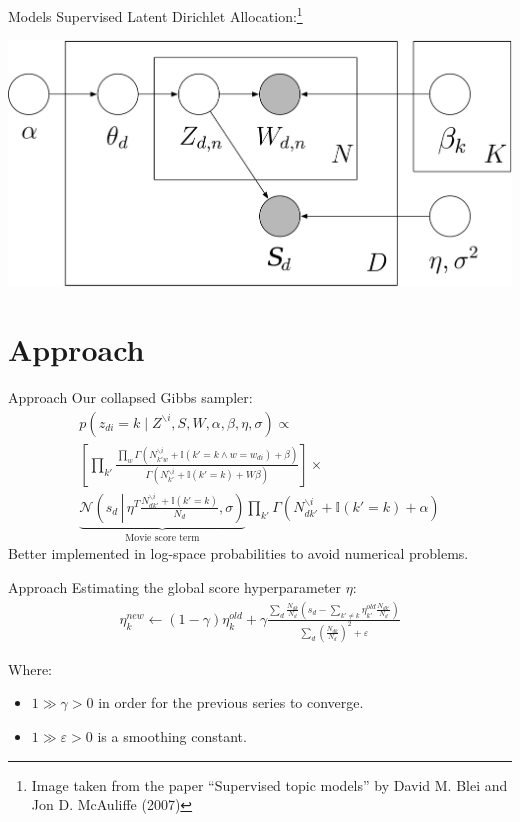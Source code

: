 \documentclass{beamer}
\begin{document}
\begin{frame}{Models}
	Supervised Latent Dirichlet Allocation:\footnote{\tiny{}Image taken from the paper ``Supervised topic models'' by David M. Blei and Jon D. McAuliffe (2007)}

	\includegraphics[width=\textwidth]{SLDA-S.png}
\end{frame}

\section{Approach}

\begin{frame}{Approach}
	Our collapsed Gibbs sampler:
	\begin{multline*}
	p(z_{di} = k \mid Z^{\backslash i}, S, W, \alpha, \beta, \eta, \sigma) \propto \\
	\left[ \prod_{k'} \frac{\prod_w \Gamma(N_{{k'}w}^{\backslash i} + \mathbb{I}(k' = k \wedge w = w_{di}) + \beta)}{\Gamma(N_{k'}^{\backslash i} + \mathbb{I}(k' = k) + W \beta)} \right] \times \\
	\underbrace{\mathcal{N}\left(s_d\, \left|\, \eta^T \frac{N_{d{k'}}^{\backslash i} + \mathbb{I}(k' = k)}{N_d}, \sigma\right. \right)}_\text{Movie score term} \prod_{k'} \Gamma(N_{d{k'}}^{\backslash i} + \mathbb{I}(k' = k) + \alpha)
	\end{multline*}
	Better implemented in log-space probabilities to avoid numerical problems.
\end{frame}

\begin{frame}{Approach}
	Estimating the global score hyperparameter $\eta$:
	\begin{multline*}
	\eta_k^{new} \leftarrow (1 - \gamma) \eta_k^{old} + \gamma \frac{\sum_d \frac{N_{dk}}{N_d} \left( s_d - \sum_{k' \ne k} \eta_{k'}^{old} \frac{N_{dk'}}{N_d} \right)}{\sum_d \left( \frac{N_{dk}}{N_d}  \right)^2 + \varepsilon}
	\end{multline*}
	
	Where:
	\begin{itemize}
	\item $1 \gg \gamma > 0$ in order for the previous series to converge.
	\item $1 \gg \varepsilon > 0$ is a smoothing constant.
	\end{itemize}
\end{frame}
\end{document}
